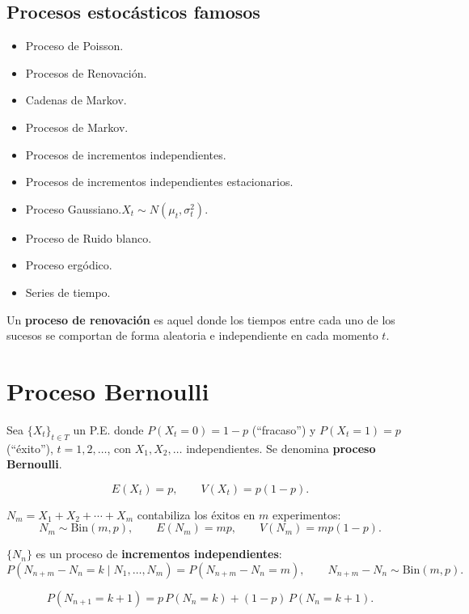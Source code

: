 \subsection{Procesos estocásticos famosos}

\begin{itemize}
    \item Proceso de Poisson.
    \item[\boldmath$\to$] Procesos de Renovación.
    \item Cadenas de Markov.
    \item Procesos de Markov.
    \item Procesos de incrementos independientes.
    \item Procesos de incrementos independientes estacionarios.
    \item[\boldmath$\to$] Proceso Gaussiano.\quad $X_t\sim N(\mu_t,\sigma^2_t)$.
    \item Proceso de Ruido blanco.
    \item Proceso ergódico.
    \item[\boldmath$\to$] Series de tiempo.
\end{itemize}

Un \textbf{proceso de renovación} es aquel donde los tiempos entre cada uno de los sucesos se comportan de forma aleatoria e independiente en cada momento $t$.

\section{Proceso Bernoulli}

\begin{defi}{}{}
Sea $\{X_t\}_{t\in T}$ un P.E. donde $P(X_t=0)=1-p$ (``fracaso'') y $P(X_t=1)=p$ (``éxito''), $t=1,2,\dots$, con $X_1,X_2,\dots$ independientes. Se denomina \textbf{proceso Bernoulli}.
\end{defi}

\[
E(X_t)=p,\qquad V(X_t)=p(1-p).
\]

$N_m=X_1+X_2+\cdots+X_m$ contabiliza los éxitos en $m$ experimentos:
\[
N_m\sim\mathrm{Bin}(m,p),\qquad E(N_m)=mp,\qquad V(N_m)=mp(1-p).
\]

$\{N_n\}$ es un proceso de \textbf{incrementos independientes}:
\[
P(N_{n+m}-N_n=k\mid N_1,\dots,N_m)=P(N_{n+m}-N_n=m),\qquad
N_{n+m}-N_n\sim\mathrm{Bin}(m,p).
\]

\begin{teo}{}{}
\[
P(N_{n+1}=k+1)=p\,P(N_n=k)+(1-p)\,P(N_n=k+1).
\]
\end{teo}

